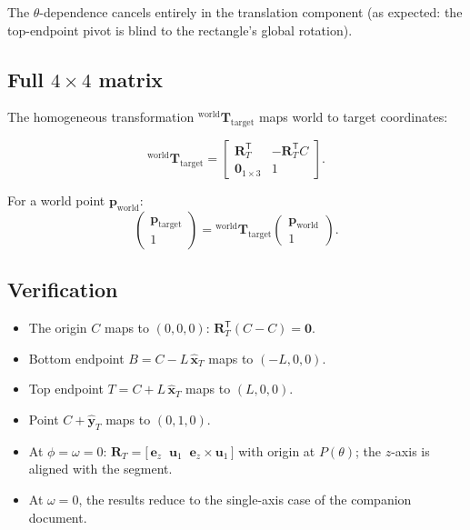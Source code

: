 \documentclass[12pt,a4paper]{article}
\newcommand{\uva}{\mathbf{u}_1}
\newcommand{\cross}{\times}
\newcommand{\Rd}{\mathbf{R}}
\newcommand{\RT}{\Rd_T}
\begin{document}
The $\theta$-dependence cancels entirely in the translation component (as
expected: the top-endpoint pivot is blind to the rectangle's global rotation).

\subsection{Full $4 \times 4$ matrix}

The homogeneous transformation ${}^{\text{world}}\mathbf{T}_{\text{target}}$
maps world to target coordinates:

\begin{equation}\label{eq:Tmat}
\boxed{
{}^{\text{world}}\mathbf{T}_{\text{target}}
= \begin{bmatrix}
    \RT^\mathsf{T} & -\RT^\mathsf{T}C \\[4pt]
    \mathbf{0}_{1\times 3} & 1
  \end{bmatrix}.
}
\end{equation}

For a world point $\mathbf{p}_{\text{world}}$:
\[
  \begin{pmatrix} \mathbf{p}_{\text{target}} \\ 1 \end{pmatrix}
  = {}^{\text{world}}\mathbf{T}_{\text{target}}
    \begin{pmatrix} \mathbf{p}_{\text{world}} \\ 1 \end{pmatrix}.
\]

\subsection{Verification}

\begin{itemize}[leftmargin=*]
  \item The origin $C$ maps to $(0,0,0)$:
    $\RT^\mathsf{T}(C-C)=\mathbf{0}$. 
  \item Bottom endpoint $B = C - L\,\hat{\mathbf{x}}_T$ maps to $(-L,0,0)$. 
  \item Top endpoint $T = C + L\,\hat{\mathbf{x}}_T$ maps to $(L,0,0)$. 
  \item Point $C + \hat{\mathbf{y}}_T$ maps to $(0,1,0)$. 
  \item At $\phi=\omega=0$: $\RT = \bigl[\,\mathbf{e}_z \;\; \uva \;\; \mathbf{e}_z\cross\uva\,\bigr]$
    with origin at $P(\theta)$; the $z$-axis is aligned with the segment. 
  \item At $\omega=0$, the results reduce to the single-axis case of the companion
    document. 
\end{itemize}
\end{document}
